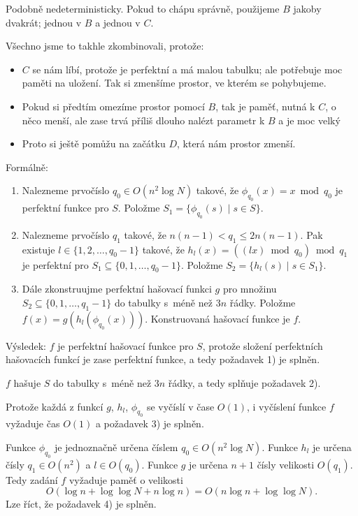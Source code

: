 \documentclass[a4paper,12pt]{article}
\newenvironment{pitemize}{
 \begin{itemize}
   \setlength{\itemsep}{1pt}
   \setlength{\parskip}{0pt}
   \setlength{\parsep}{0pt}
 }{\end{itemize}}
\begin{document}
Podobně nedeterministicky. Pokud to chápu správně, použijeme $B$ jakoby dvakrát; jednou v $B$ a jednou v $C$.

Všechno jsme to takhle zkombinovali, protože:
\begin{pitemize}
\item $C$ se nám líbí, protože je perfektní a má malou tabulku; ale potřebuje moc paměti na uložení. Tak si zmenšíme prostor, ve kterém se pohybujeme.
\item Pokud si předtím omezíme prostor pomocí $B$, tak je paměť, nutná k $C$, o něco menší, ale zase trvá příliš dlouho nalézt parametr k $B$ a je moc velký
\item Proto si ještě pomůžu na začátku $D$, která nám prostor zmenší.
\end{pitemize}

Formálně:

\begin{enumerate}
\item
Nalezneme prvočíslo $q_0\in O(n^2\log N)$ takové, že 
$\phi_{q_0}(x)=x\bmod q_0$ je perfektní funkce pro $S$. Položme 
$S_1=\{\phi_{q_0}(s)\mid s\in S\}$.
\item
Nalezneme prvočíslo $q_1$ takové, že 
$n(n-1)<q_1\le 2n(n-1)$. Pak existuje 
$l\in \{1,2,\dots,q_0-1\}$ takové, že $h_l(x)=((lx)\bmod q_0
)\bmod q_1$ 
je perfektní pro $S_1\subseteq \{0,1,\dots,q_0-1\}$. Položme 
$S_2=\{h_l(s)\mid s\in S_1\}$.
\item
Dále zkonstruujme perfektní hašovací funkci 
$g$ pro množinu 
$S_2\subseteq \{0,1,\dots,q_1-1\}$ do tabulky s~méně než $
3n$ řádky. 
Položme $f(x)=g(h_l(\phi_{q_0}(x)))$. Konstruovaná hašovací 
funkce je $f$.
\end{enumerate}

Výsledek: $f$ je perfektní hašovací funkce pro $
S$, protože 
složení perfektních hašovacích funkcí je zase perfektní 
funkce, a tedy požadavek 1) je splněn. 

 
$f$ hašuje $S$ do tabulky s~méně než $3n$ řádky, a tedy 
splňuje požadavek 2). 


Protože každá z funkcí $g$, $h_l$, $\phi_{q_0}$ se vyčíslí v čase $
O(1)$, 
i vyčíslení funkce $f$ vyžaduje čas $O(1)$ a požadavek 3) je 
splněn.


Funkce $\phi_{q_0}$ je jednoznačně určena číslem $
q_0\in O(n^2\log N)$. 
Funkce $h_l$ je určena čísly $q_1\in O(n^2)$ a $l\in O(
q_0)$. Funkce $g$ 
je určena $n+1$ čísly velikosti $O(q_1)$. Tedy zadání $
f$ 
vyžaduje paměť o velikosti 
$$O(\log n+\log\log N+n\log n)=O(n\log n+\log\log N).$$
Lze říct, že požadavek 4) je splněn. 
\end{document}
